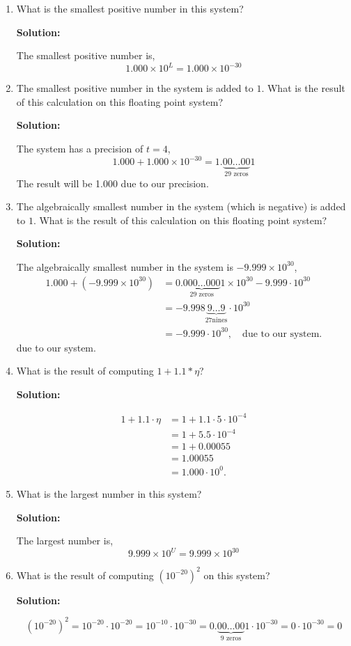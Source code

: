 \documentclass[11pt]{article}
\newenvironment{solution}
  {\par\noindent\textbf{Solution:}\par}
  {\par}
\begin{document}
\begin{enumerate}
\begin{enumerate}
\item What is the smallest positive number in this system?
  \begin{solution}
    The smallest positive number is,
    $$1.000 \times 10^L = 1.000 \times 10^{-30}$$
  \end{solution}

\item The smallest positive number in the system is added to $1$. What is the result of this calculation on this floating point system?
  \begin{solution}
  The system has a precision of $t=4$, 
  $$1.000 + 1.000 \times 10^{-30} = 1.\underbrace{00\dots 00}_{29\text{ zeros}} 1$$
  The result will be 1.000 due to our precision.
  \end{solution}


\item The algebraically smallest number in the system (which is negative) is added to $1$. What is the result of this calculation on this floating point system?
  \begin{solution}
    The algebraically smallest number in the system is $-9.999 \times 10^{30}$, 
    \begin{align*}
      1.000 + (-9.999 \times 10^{30}) &= 0.\underbrace{000\dots000}_{29\text{ zeros}}1 \times 10^{30} - 9.999 \cdot 10^{30} \\
      &= -9.998\underbrace{9\dots9}_{27 \text{nines}} \cdot 10^{30} \\
      &= -9.999 \cdot 10^{30}, \quad \text{due to our system.}
    \end{align*}
    due to our system.
  \end{solution}


\item What is the result of computing  $1+1.1 * \eta$?
  \begin{solution}
    \begin{align*}
      1 + 1.1 \cdot \eta &= 1 + 1.1 \cdot 5 \cdot 10^{-4} \\
                        &= 1 + 5.5 \cdot 10^{-4} \\
                        &= 1 + 0.00055 \\
                        &= 1.00055 \\
                        &= 1.000 \cdot 10^0.
    \end{align*}
  \end{solution}
\item What is the largest number in this system?
  \begin{solution}
    The largest number is, 
    $$9.999 \times 10^U = 9.999 \times 10^{30}$$
  \end{solution}
\item What is the result of computing $(10^{-20})^2$ on this system?
  \begin{solution}
    $$(10^{-20})^2 = 10^{-20} \cdot 10^{-20} = 10^{-10} \cdot 10^{-30} = 0.\underbrace{00\dots00}_\text{9 zeros}1 \cdot 10^{-30} = 0 \cdot 10^{-30} = 0$$


\end{solution}
\end{enumerate}
\end{enumerate}
\end{document}
